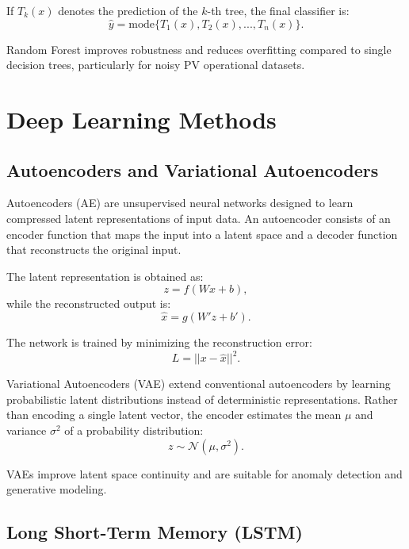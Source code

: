If $T_k(x)$ denotes the prediction of the $k$-th tree, the final classifier is:
\begin{equation}
\hat{y}=\text{mode}\{T_1(x),T_2(x),...,T_n(x)\}.
\end{equation}

Random Forest improves robustness and reduces overfitting compared to single decision trees, particularly for noisy PV operational datasets.

\section{Deep Learning Methods}
\label{sec:dl_background}

\subsection{Autoencoders and Variational Autoencoders}

Autoencoders (AE) are unsupervised neural networks designed to learn compressed latent representations of input data. An autoencoder consists of an encoder function that maps the input into a latent space and a decoder function that reconstructs the original input.

The latent representation is obtained as:
\begin{equation}
z=f(Wx+b),
\end{equation}
while the reconstructed output is:
\begin{equation}
\hat{x}=g(W'z+b').
\end{equation}

The network is trained by minimizing the reconstruction error:
\begin{equation}
L=||x-\hat{x}||^2.
\end{equation}

Variational Autoencoders (VAE) extend conventional autoencoders by learning probabilistic latent distributions instead of deterministic representations. Rather than encoding a single latent vector, the encoder estimates the mean $\mu$ and variance $\sigma^2$ of a probability distribution:
\begin{equation}
z \sim \mathcal{N}(\mu,\sigma^2).
\end{equation}

VAEs improve latent space continuity and are suitable for anomaly detection and generative modeling.

\subsection{Long Short-Term Memory (LSTM)}

